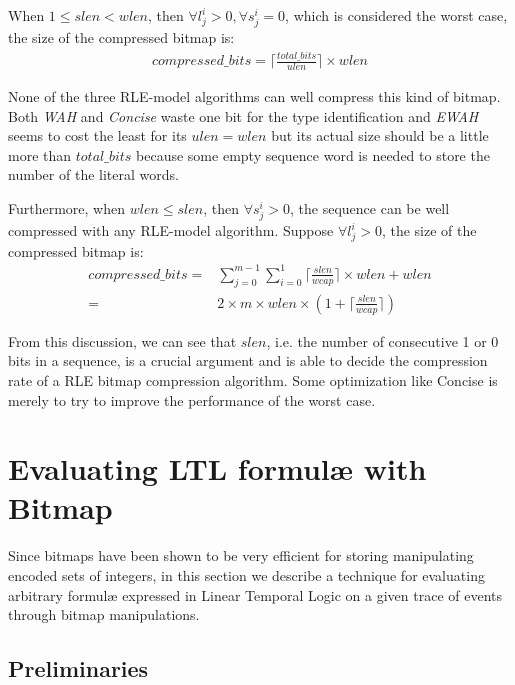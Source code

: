 When $1 \leq slen < wlen$, then $\forall l^i_j > 0, \forall s^i_j = 0$, which is considered the worst case, the size of the compressed bitmap is:
\begin{align*}
compressed\_bits = \lceil \frac{total\_bits}{ulen} \rceil \times wlen 
\end{align*}

None of the three RLE-model algorithms can well compress this kind of bitmap. Both \emph{WAH} and \emph{Concise} waste one bit for the type identification and \emph{EWAH} seems to cost the least for its $ulen = wlen$ but its actual size should be a little more than $total\_bits$ because some empty sequence word is needed to store the number of the literal words.

Furthermore, when $wlen \leq slen$, then $\forall s^i_j > 0$, the sequence can be well compressed with any RLE-model algorithm. Suppose $\forall l^i_j > 0$, the size of the compressed bitmap is:
\begin{align*}
compressed\_bits = &\sum_{j = 0}^{m - 1} \sum_{i = 0}^1 \lceil \frac{slen}{wcap} \rceil \times wlen + wlen \\
= & 2 \times m \times wlen \times (1 + \lceil \frac{slen}{wcap} \rceil)
\end{align*}

From this discussion, we can see that $slen$, i.e. the number of consecutive 1 or 0 bits in a sequence, is a crucial argument and is able to decide the compression rate of a RLE bitmap compression algorithm. Some optimization like Concise is merely to try to improve the performance of the worst case.


\section{Evaluating LTL formul\ae{} with Bitmap}\label{sec:bm:ltlbitmap} %

Since bitmaps have been shown to be very efficient for storing manipulating encoded sets of integers, in this section we describe a technique for evaluating arbitrary formul\ae{} expressed in Linear Temporal Logic on a given trace of events through bitmap manipulations.

\subsection{Preliminaries}

